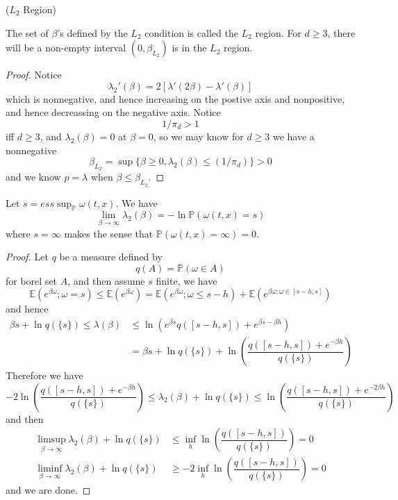 \begin{definition}
    ($L_2$ Region)\par
    The set of $\beta$'s defined by the $L_2$ condition is called the $L_2$ region. For $d\geq 3$, there will be a non-empty interval $(0,\beta_{L_2})$ is in the $L_2$ region.
\end{definition}
\begin{proof}
    Notice
    \[
    \lambda_2'(\beta) = 2[\lambda'(2\beta) - \lambda'(\beta)]
    \]
    which is nonnegative, and hence increasing on the postive axis and nonpositive, and hence decreassing on the negative axis. Notice
    \[1/\pi_d > 1\]
    iff $d\geq 3$, and $\lambda_2(\beta) = 0$ at $\beta = 0$, so we may know for $d\geq 3$ we have a nonnegative
    \[
    \beta_{L_2} = \sup \{\beta \geq 0,\lambda_2(\beta) \leq(1/\pi_d)\} > 0
    \]
    and we know $p = \lambda$ when $\beta \leq \beta_ {L_2}$. 
\end{proof}

\begin{corollary}
    Let $s= ess\sup_{\mathbb{P}}\omega(t,x)$. We have
    \[
    \lim_{\beta\to\infty} \lambda_2(\beta) = -\ln\mathbb{P}(\omega(t,x) = s)
    \]
    where $s = \infty$ makes the sense that $\mathbb{P}(\omega(t,x) = \infty) = 0$.
\end{corollary}
\begin{proof}
    Let $q$ be a measure defined by
    \[q(A) = \mathbb{P}(\omega \in A)\]
    for borel set $A$, and then assume $s$ finite, we have
    \[
    \mathbb{E}(e^{\beta \omega};\omega = s) \leq \mathbb{E}(e^{\beta \omega}) = \mathbb{E}(e^{\beta\omega}; \omega \leq s-h) + \mathbb{E}(e^{\beta\omega; \omega \in [s-h,s]})
    \]
    and hence
    \[
    \begin{aligned}
        \beta s + \ln q(\{s\}) \leq \lambda (\beta) &\leq \ln(e^{\beta s}q([s-h,s]) + e^{\beta s -\beta h})\\ &= \beta s +\ln q(\{s\}) + \ln\left(\dfrac{q([s-h,s])+e^{-\beta h}}{q(\{s\})}\right)
    \end{aligned}
    \]
    Therefore we have
    \[
    - 2\ln\left(\dfrac{q([s-h,s])+e^{-\beta h}}{q(\{s\})}\right) \leq \lambda_2(\beta) + \ln q(\{s\}) \leq \ln\left(\dfrac{q([s-h,s])+e^{-2\beta h}}{q(\{s\})}\right)
    \]
    and then
    \[
    \begin{aligned}
        \limsup_{\beta\to\infty}\lambda_2(\beta) + \ln q(\{s\}) &\leq \inf_{h}\ln\left(\dfrac{q([s-h,s])}{q(\{s\})}\right) = 0 \\
        \liminf_{\beta\to\infty}\lambda_2(\beta) + \ln q(\{s\}) &\geq -2\inf_{h}\ln\left(\dfrac{q([s-h,s])}{q(\{s\})}\right) = 0
    \end{aligned}
    \]
    and we are done.
\end{proof}

